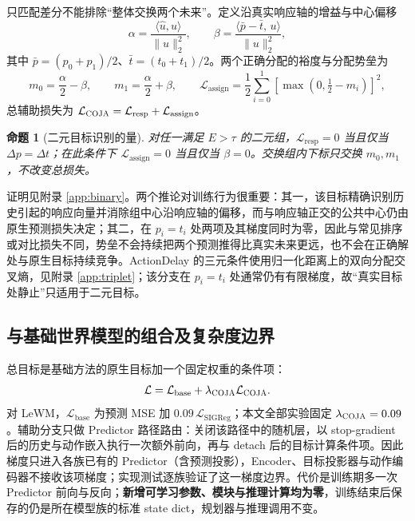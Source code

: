 \documentclass[UTF8,zihao=-4,fontset=fandol]{ctexart}
\newcommand{\method}{\textsc{COJA}}
\newtheorem{proposition}{命题}
\begin{document}
只匹配差分不能排除“整体交换两个未来”。定义沿真实响应轴的增益与中心偏移
\begin{equation}
  \alpha=\frac{\langle\hat u,u\rangle}{\lVert u\rVert_2^2},\qquad
  \beta=\frac{\langle\bar p-\bar t,\,u\rangle}{\lVert u\rVert_2^2},
\end{equation}
其中 $\bar p=(p_0+p_1)/2$、$\bar t=(t_0+t_1)/2$。两个正确分配的裕度与分配势垒为
\begin{equation}
  m_0=\frac{\alpha}{2}-\beta,\qquad m_1=\frac{\alpha}{2}+\beta,\qquad
  \mathcal{L}_{\mathrm{assign}}=\frac{1}{2}\sum_{i=0}^{1}\left[\max\left(0,\tfrac12-m_i\right)\right]^2,
\end{equation}
总辅助损失为 $\mathcal{L}_{\method}=\mathcal{L}_{\mathrm{resp}}+\mathcal{L}_{\mathrm{assign}}$。

\begin{proposition}[二元目标识别的量]
\label{prop:binary}
对任一满足 $E>\tau$ 的二元组，$\mathcal{L}_{\mathrm{resp}}=0$ 当且仅当 $\Delta p=\Delta t$；在此条件下 $\mathcal{L}_{\mathrm{assign}}=0$ 当且仅当 $\beta=0$。交换组内下标只交换 $m_0,m_1$，不改变总损失。
\end{proposition}

证明见附录 \ref{app:binary}。两个推论对训练行为很重要：其一，该目标精确识别历史引起的响应向量并消除组中心沿响应轴的偏移，而与响应轴正交的公共中心仍由原生预测损失决定；其二，在 $p_i=t_i$ 处两项及其梯度同时为零，因此与常见排序或对比损失不同，势垒不会持续把两个预测推得比真实未来更远，也不会在正确解处与原生目标持续竞争。ActionDelay 的三元条件使用归一化距离上的双向分配交叉熵，见附录 \ref{app:triplet}；该分支在 $p_i=t_i$ 处通常仍有有限梯度，故“真实目标处静止”只适用于二元目标。

\subsection{与基础世界模型的组合及复杂度边界}

总目标是基础方法的原生目标加一个固定权重的条件项：
\begin{equation}
  \mathcal{L}=\mathcal{L}_{\mathrm{base}}+\lambda_{\method}\mathcal{L}_{\method}.
\end{equation}
对 LeWM，$\mathcal{L}_{\mathrm{base}}$ 为预测 MSE 加 $0.09\,\mathcal{L}_{\mathrm{SIGReg}}$；本文全部实验固定 $\lambda_{\method}=0.09$。辅助分支只做 Predictor 路径路由：关闭该路径中的随机层，以 stop-gradient 后的历史与动作嵌入执行一次额外前向，再与 detach 后的目标计算条件项。因此梯度只进入各族已有的 Predictor（含预测投影），Encoder、目标投影器与动作编码器不接收该项梯度；实现测试逐族验证了这一梯度边界。代价是训练期多一次 Predictor 前向与反向；\textbf{新增可学习参数、模块与推理计算均为零}，训练结束后保存的仍是所在模型族的标准 state dict，规划器与推理调用不变。
\end{document}
